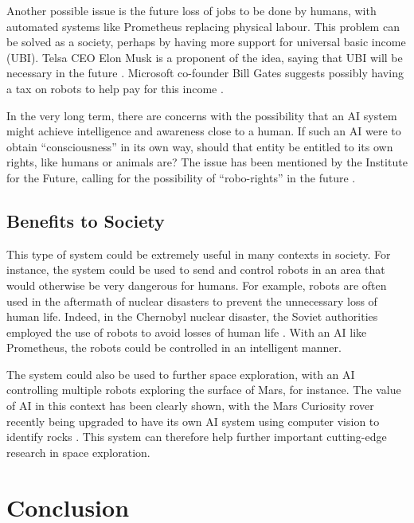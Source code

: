 \documentclass[titlepage,11pt]{article}
\begin{document}
Another possible issue is the future loss of jobs to be done by humans, with automated systems like Prometheus replacing physical labour. This problem can be solved as a society, perhaps by having more support for universal basic income (UBI). Telsa CEO Elon Musk is a proponent of the idea, saying that UBI will be necessary in the future \cite{musk}. Microsoft co-founder Bill Gates suggests possibly having a tax on robots to help pay for this income \cite{gates}.

In the very long term, there are concerns with the possibility that an AI system might achieve intelligence and awareness close to a human. If such an AI were to obtain ``consciousness'' in its own way, should that entity be entitled to its own rights, like humans or animals are? The issue has been mentioned by the Institute for the Future, calling for the possibility of ``robo-rights'' in the future \cite{robo_rights}.


\subsection{Benefits to Society}

This type of system could be extremely useful in many contexts in society. For instance, the system could be used to send and control robots in an area that would otherwise be very dangerous for humans. For example, robots are often used in the aftermath of nuclear disasters to prevent the unnecessary loss of human life. Indeed, in the Chernobyl nuclear disaster, the Soviet authorities employed the use of robots to avoid losses of human life \cite{chernobyl}. With an AI like Prometheus, the robots could be controlled in an intelligent manner.

The system could also be used to further space exploration, with an AI controlling multiple robots exploring the surface of Mars, for instance. The value of AI in this context has been clearly shown, with the Mars Curiosity rover recently being upgraded to have its own AI system using computer vision to identify rocks \cite{rover}. This system can therefore help further important cutting-edge research in space exploration.

\section{Conclusion}
\end{document}
